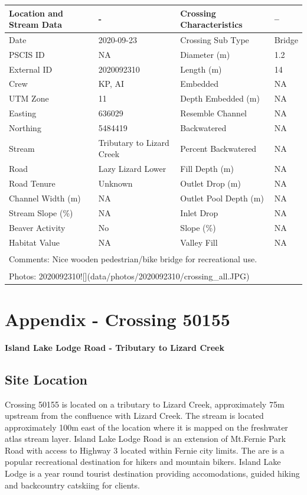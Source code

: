 \documentclass[
]{book}
\begin{document}
\begin{tabular}{llll}
\toprule
Location and Stream Data & - & Crossing Characteristics & --\\
\midrule
Date & 2020-09-23 & Crossing Sub Type & Bridge\\
PSCIS ID & NA & Diameter (m) & 1.2\\
External ID & 2020092310 & Length (m) & 14\\
Crew & KP, AI & Embedded & NA\\
UTM Zone & 11 & Depth Embedded (m) & NA\\
\addlinespace
Easting & 636029 & Resemble Channel & NA\\
Northing & 5484419 & Backwatered & NA\\
Stream & Tributary to Lizard Creek & Percent Backwatered & NA\\
Road & Lazy Lizard Lower & Fill Depth (m) & NA\\
Road Tenure & Unknown & Outlet Drop (m) & NA\\
\addlinespace
Channel Width (m) & NA & Outlet Pool Depth (m) & NA\\
Stream Slope (\%) & NA & Inlet Drop & NA\\
Beaver Activity & No & Slope (\%) & NA\\
Habitat Value & NA & Valley Fill & NA\\
\bottomrule
\multicolumn{4}{l}{\textsuperscript{} Comments: Nice wooden pedestrian/bike bridge for recreational use.}\\
\multicolumn{4}{l}{\textsuperscript{} Photos: 2020092310![](data/photos/2020092310/crossing\_all.JPG)}\\
\end{tabular}

\hypertarget{appendix---crossing-50155}{%
\chapter*{Appendix - Crossing 50155}\label{appendix---crossing-50155}}

\textbf{Island Lake Lodge Road - Tributary to Lizard Creek}

\hypertarget{site-location}{%
\section*{Site Location}\label{site-location}}

Crossing 50155 is located on a tributary to Lizard Creek, approximately 75m upstream from the confluence with Lizard Creek. The stream is located approximately 100m east of the location where it is mapped on the freshwater atlas stream layer. Island Lake Lodge Road is an extension of Mt.Fernie Park Road with access to Highway 3 located within Fernie city limits. The are is a popular recreational destination for hikers and mountain bikers. Island Lake Lodge is a year round tourist destination providing accomodations, guided hiking and backcountry catskiing for clients.
\end{document}
